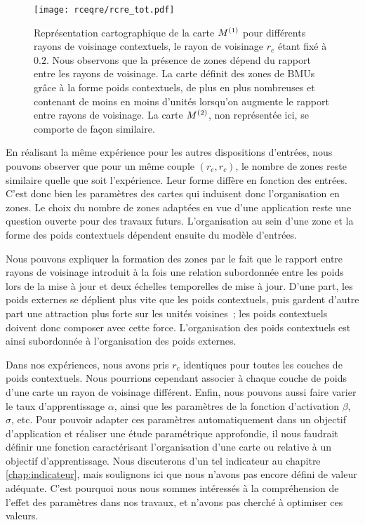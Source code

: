 \documentclass[../main]{subfiles}
\begin{document}
\begin{figure}[ht]
	\texttt{[image: rceqre/rcre\_tot.pdf]}
	\caption{Représentation cartographique de la carte $M^{({1})}$ pour différents rayons de voisinage contextuels, le rayon de voisinage $r_e$ étant fixé à $0.2$. Nous observons que la présence de zones dépend du rapport entre les rayons de voisinage. La carte définit des zones de BMUs grâce à la forme poids contextuels, de plus en plus nombreuses et contenant de moins en moins d'unités lorsqu'on augmente le rapport entre rayons de voisinage.
	La carte $M^{({2})}$, non représentée ici, se comporte de façon similaire.\label{fig:rcre}
	}
\end{figure}	

En réalisant la même expérience pour les autres dispositions d'entrées, nous pouvons observer que pour un même couple $(r_e,r_c)$, le nombre de zones reste similaire quelle que soit l'expérience. Leur forme diffère en fonction des entrées.
C'est donc bien les paramètres des cartes qui induisent donc l'organisation en zones. Le choix du nombre de zones adaptées en vue d'une application reste une question ouverte pour des travaux futurs.
L'organisation au sein d'une zone et la forme des poids contextuels dépendent ensuite du modèle d'entrées.

Nous pouvons expliquer la formation des zones par le fait que le rapport entre rayons de voisinage introduit à la fois une relation subordonnée entre les poids lors de la mise à jour et deux échelles temporelles de mise à jour. 
D'une part, les poids externes se déplient plus vite que les poids contextuels, puis gardent d'autre part une \og attraction \fg{} plus forte sur les unités voisines~; les poids contextuels doivent donc composer avec cette force. L'organisation des poids contextuels est ainsi subordonnée à l'organisation des poids externes.

Dans nos expériences, nous avons pris $r_c$ identiques pour toutes les couches de poids contextuels.
Nous pourrions cependant associer à chaque couche de poids d'une carte un rayon de voisinage différent. 
Enfin, nous pouvons aussi faire varier le taux d'apprentissage $\alpha$, ainsi que les paramètres de la fonction d'activation $\beta$, $\sigma$, etc.
Pour pouvoir adapter ces paramètres automatiquement dans un objectif d'application et réaliser une étude paramétrique approfondie, il nous faudrait définir une fonction caractérisant l'organisation d'une carte ou relative à un objectif d'apprentissage. 
Nous discuterons d'un tel indicateur au chapitre \ref{chap:indicateur}, mais soulignons ici que nous n'avons pas encore défini de valeur adéquate. C'est pourquoi nous nous sommes intéressés à la compréhension de l'effet des paramètres dans nos travaux, et n'avons pas cherché à optimiser ces valeurs.
\end{document}
